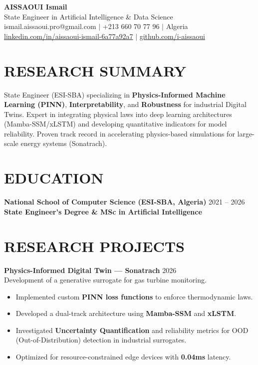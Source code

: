 \documentclass[a4paper,11pt]{article}
\begin{document}
\begin{center}
    {\Huge\bfseries\color{titleblue} AISSAOUI Ismail}\\[4pt]
    {\Large State Engineer in Artificial Intelligence \& Data Science}\\[6pt]
    ismail.aissaoui.pro@gmail.com $|$ +213 660 70 77 96 $|$ Algeria \\
    \href{https://linkedin.com/in/aissaoui-ismail-6a77a92a7}{linkedin.com/in/aissaoui-ismail-6a77a92a7} $|$ \href{https://github.com/i-aissaoui}{github.com/i-aissaoui}
\end{center}

\section{RESEARCH SUMMARY}
State Engineer (ESI-SBA) specializing in \textbf{Physics-Informed Machine Learning (PINN)}, \textbf{Interpretability}, and \textbf{Robustness} for industrial Digital Twins. Expert in integrating physical laws into deep learning architectures (Mamba-SSM/xLSTM) and developing quantitative indicators for model reliability. Proven track record in accelerating physics-based simulations for large-scale energy systems (Sonatrach).

\section{EDUCATION}
\textbf{National School of Computer Science (ESI-SBA, Algeria)} \hfill 2021 -- 2026 \\
\textbf{State Engineer's Degree \& MSc in Artificial Intelligence}

\section{RESEARCH PROJECTS}

\textbf{Physics-Informed Digital Twin — Sonatrach} \hfill 2026 \\
Development of a generative surrogate for gas turbine monitoring.
\begin{itemize}
    \item Implemented custom \textbf{PINN loss functions} to enforce thermodynamic laws.
    \item Developed a dual-track architecture using \textbf{Mamba-SSM} and \textbf{xLSTM}.
    \item Investigated \textbf{Uncertainty Quantification} and reliability metrics for OOD (Out-of-Distribution) detection in industrial surrogates.
    \item Optimized for resource-constrained edge devices with \textbf{0.04ms} latency.
\end{itemize}
\end{document}
